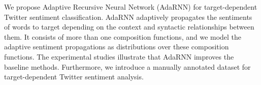 We propose Adaptive Recursive Neural Network (AdaRNN) for target-dependent Twitter sentiment classification. AdaRNN adaptively propagates the sentiments of words to target depending on the context and syntactic relationships between them. It consists of more than one composition functions, and we model the adaptive sentiment propagations as distributions over these composition functions. The experimental studies illustrate that AdaRNN improves the baseline methods. Furthermore, we introduce a manually annotated dataset for target-dependent Twitter sentiment analysis.
